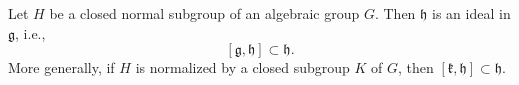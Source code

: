 Let $H$ be a closed normal subgroup of an algebraic group $G$. Then $\mathfrak{h}$ is an ideal in $\mathfrak{g}$, i.e.,
$$[\mathfrak{g}, \mathfrak{h}] \subset \mathfrak{h}.$$
More generally, if $H$ is normalized by a closed subgroup $K$ of $G$, then $[\mathfrak{k}, \mathfrak{h}] \subset \mathfrak{h}$.
